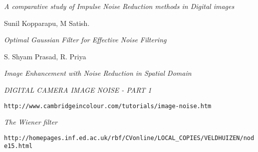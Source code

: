 \begin{thebibliography}{9}
\textit{A comparative study of Impulse Noise Reduction methods in Digital images}

 Sunil Kopparapu, M Satish.

\textit{Optimal Gaussian Filter for Effective Noise Filtering}

 S. Shyam Prasad, R. Priya 
 
 \textit{Image Enhancement with Noise Reduction in Spatial Domain}

 
 \textit{DIGITAL CAMERA IMAGE NOISE - PART 1}

\texttt{http://www.cambridgeincolour.com/tutorials/image-noise.htm}

 
 \textit{The Wiener filter}

\texttt{http://homepages.inf.ed.ac.uk/rbf/CVonline/LOCAL\_COPIES/VELDHUIZEN/node15.html}







\end{thebibliography}


































